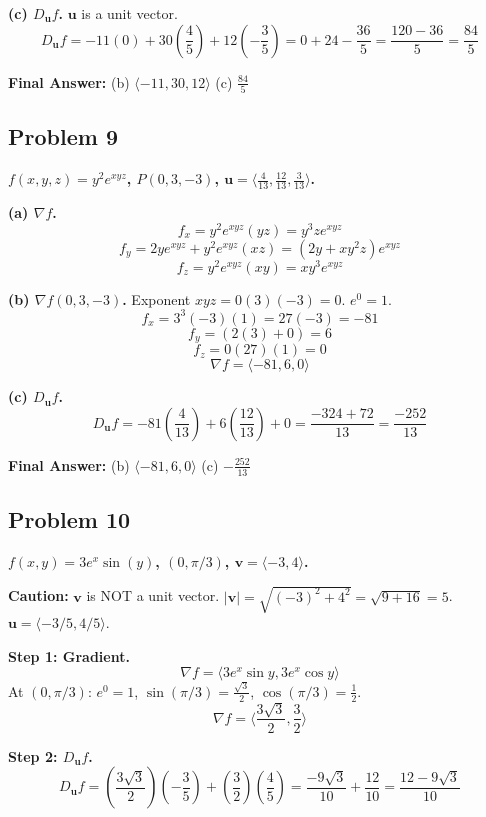 \documentclass{article}
\begin{document}
\textbf{(c) $D_{\mathbf{u}}f$.}
$\mathbf{u}$ is a unit vector.
\[ D_{\mathbf{u}}f = -11(0) + 30\left(\frac{4}{5}\right) + 12\left(-\frac{3}{5}\right) = 0 + 24 - \frac{36}{5} = \frac{120 - 36}{5} = \frac{84}{5} \]

\textbf{Final Answer:}
(b) $\langle -11, 30, 12 \rangle$ \quad (c) $\boxed{\frac{84}{5}}$

\hrulefill

\subsection*{Problem 9}
\textbf{$f(x, y, z) = y^2 e^{xyz}$, $P(0, 3, -3)$, $\mathbf{u} = \langle \frac{4}{13}, \frac{12}{13}, \frac{3}{13} \rangle$.}

\textbf{(a) $\nabla f$.}
\[ f_x = y^2 e^{xyz}(yz) = y^3 z e^{xyz} \]
\[ f_y = 2y e^{xyz} + y^2 e^{xyz}(xz) = (2y + xy^2z)e^{xyz} \]
\[ f_z = y^2 e^{xyz}(xy) = xy^3 e^{xyz} \]

\textbf{(b) $\nabla f(0, 3, -3)$.}
Exponent $xyz = 0(3)(-3) = 0$. $e^0 = 1$.
\[ f_x = 3^3(-3)(1) = 27(-3) = -81 \]
\[ f_y = (2(3) + 0) = 6 \]
\[ f_z = 0(27)(1) = 0 \]
\[ \nabla f = \langle -81, 6, 0 \rangle \]

\textbf{(c) $D_{\mathbf{u}}f$.}
\[ D_{\mathbf{u}}f = -81\left(\frac{4}{13}\right) + 6\left(\frac{12}{13}\right) + 0 = \frac{-324 + 72}{13} = \frac{-252}{13} \]

\textbf{Final Answer:}
(b) $\langle -81, 6, 0 \rangle$ \quad (c) $\boxed{-\frac{252}{13}}$

\hrulefill

\subsection*{Problem 10}
\textbf{$f(x, y) = 3e^x \sin(y)$, $(0, \pi/3)$, $\mathbf{v} = \langle -3, 4 \rangle$.}

\textbf{Caution:} $\mathbf{v}$ is NOT a unit vector.
$|\mathbf{v}| = \sqrt{(-3)^2 + 4^2} = \sqrt{9+16} = 5$.
$\mathbf{u} = \langle -3/5, 4/5 \rangle$.

\textbf{Step 1: Gradient.}
\[ \nabla f = \langle 3e^x \sin y, 3e^x \cos y \rangle \]
At $(0, \pi/3)$: $e^0 = 1$, $\sin(\pi/3)=\frac{\sqrt{3}}{2}$, $\cos(\pi/3)=\frac{1}{2}$.
\[ \nabla f = \langle \frac{3\sqrt{3}}{2}, \frac{3}{2} \rangle \]

\textbf{Step 2: $D_{\mathbf{u}}f$.}
\[ D_{\mathbf{u}}f = \left(\frac{3\sqrt{3}}{2}\right)\left(-\frac{3}{5}\right) + \left(\frac{3}{2}\right)\left(\frac{4}{5}\right) = \frac{-9\sqrt{3}}{10} + \frac{12}{10} = \frac{12 - 9\sqrt{3}}{10} \]
\end{document}
